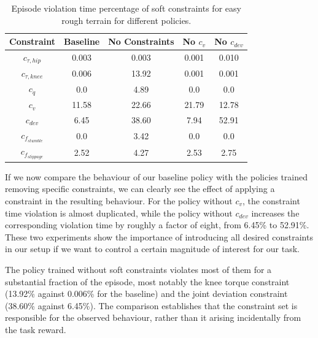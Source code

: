 \begin{table}[width=\columnwidth,cols=5]
    \centering
    \caption{Episode violation time percentage of soft constraints for easy rough terrain for different policies.}
    \renewcommand{\arraystretch}{1.3} %
    \begin{tabular}{c c c c c} 
        \toprule
        \textbf{Constraint} & \textbf{Baseline} & \textbf{No Constraints} & \textbf{No $c_v$} & \textbf{No $c_{dev}$} \\
        \midrule
        $c_{\tau,hip}$     & 0.003   & 0.003   & 0.001 & 0.010   \\
        $c_{\tau,knee}$   & 0.006  & 13.92   & 0.001 & 0.001 \\
        $c_{\dot{q}}$  & 0.0      & 4.89   & 0.0     & 0.0    \\
        $c_v$       & 11.58  & 22.66  & 21.79   & 12.78  \\
        $c_{dev}$ & 6.45   & 38.60   & 7.94  & 52.91  \\
        $c_{f_{stumble}}$         & 0.0      & 3.42     & 0.0     & 0.0      \\
        $c_{f_{slippage}}$       & 2.52  & 4.27  & 2.53   & 2.75 \\
        \bottomrule
    \end{tabular}
    \label{tab:constraint-ablation}
\end{table}

If we now compare the behaviour of our baseline policy with the policies trained removing specific constraints, we can clearly see the effect of applying a constraint in the resulting behaviour. For the policy without $c_v$, the constraint time violation is almost duplicated, while the policy without $c_{dev}$ increases the corresponding violation time by roughly a factor of eight, from 6.45\% to 52.91\%. These two experiments show the importance of introducing all desired constraints in our setup if we want to control a certain magnitude of interest for our task.

The policy trained without soft constraints violates most of them for a substantial fraction of the episode, most notably the knee torque constraint (13.92\% against 0.006\% for the baseline) and the joint deviation constraint (38.60\% against 6.45\%). The comparison establishes that the constraint set is responsible for the observed behaviour, rather than it arising incidentally from the task reward.

